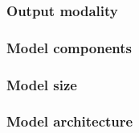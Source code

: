 \documentclass{article}
\begin{document}
\subsubsection{Output modality}

\subsubsection{Model components}


\subsubsection{Model size}


\subsubsection{Model architecture}

\end{document}
